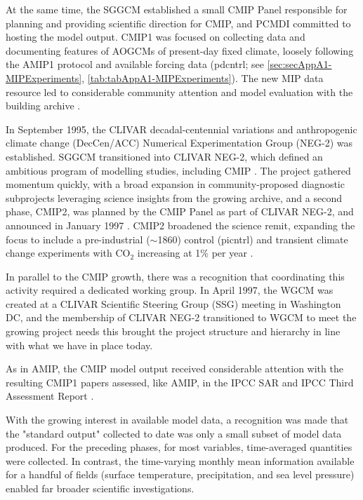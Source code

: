 \documentclass[manuscript]{copernicus}
\begin{document}
At the same time, the SGGCM established a small CMIP Panel responsible for planning and providing scientific direction for CMIP, and PCMDI committed to hosting the model output. CMIP1 was focused on collecting data and documenting features of AOGCMs of present-day fixed climate, loosely following the AMIP1 protocol and available forcing data (pdcntrl; see \autoref{sec:secAppA1-MIPExperiments}, \autoref{tab:tabAppA1-MIPExperiments}). The new MIP data resource led to considerable community attention and model evaluation with the building archive \citep{lambert_cmip1_2001,raisanen_co2-induced_2001,villwock_6th_2003}.

In September 1995, the CLIVAR decadal-centennial variations and anthropogenic climate change (DecCen/ACC) Numerical Experimentation Group (NEG-2) was established. SGGCM transitioned into CLIVAR NEG-2, which defined an ambitious program of modelling studies, including CMIP \citep{coughlan_report_1996,villwock_what_1996}. The project gathered momentum quickly, with a broad expansion in community-proposed diagnostic subprojects leveraging science insights from the growing archive, and a second phase, CMIP2, was planned by the CMIP Panel as part of CLIVAR NEG-2, and announced in January 1997 \citep{meehl_intercomparison_1997,meehl_coupled_2000}. CMIP2 broadened the science remit, expanding the focus to include a pre-industrial ($\sim$1860) control (picntrl) and transient climate change experiments with CO$_{2}$ increasing at 1\% per year \citep[1pctCO2, see \autoref{tab:tabAppA1-MIPExperiments};][]{meehl_cmip_2003,villwock_6th_2003}.

In parallel to the CMIP growth, there was a recognition that coordinating this activity required a dedicated working group. In April 1997, the WGCM was created at a CLIVAR Scientific Steering Group (SSG) meeting in Washington DC, and the membership of CLIVAR NEG-2 transitioned to WGCM to meet the growing project needs \citep{detemmerman_clivar_1997} this brought the project structure and hierarchy in line with what we have in place today.

As in AMIP, the CMIP model output received considerable attention with the resulting CMIP1 papers assessed, like AMIP, in the IPCC SAR \citep{gates_climate_1996} and IPCC Third Assessment Report \citep[TAR;][]{mcavaney_model_2001}.

With the growing interest in available model data, a recognition was made that the "standard output" collected to date was only a small subset of model data produced. For the preceding phases, for most variables, time-averaged quantities were collected. In contrast, the time-varying monthly mean information available for a handful of fields (surface temperature, precipitation, and sea level pressure) enabled far broader scientific investigations.
\end{document}
